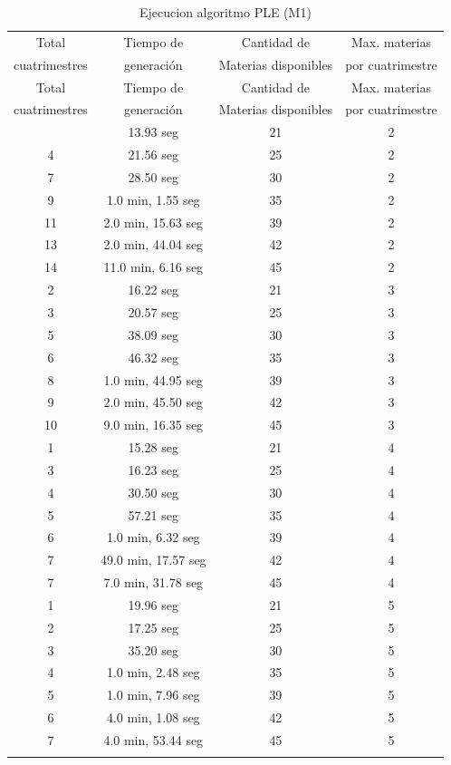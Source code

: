 \documentclass[a4paper]{article}
\begin{document}
\begin{longtable}{| c | c | c | c |}
\hline
Total   & Tiempo de & Cantidad de & Max. materias  \\
cuatrimestres &  generación &  Materias disponibles & por cuatrimestre \\
\hline \hline
\endfirsthead
\hline
Total   & Tiempo de & Cantidad de & Max. materias  \\
cuatrimestres &  generación &  Materias disponibles & por cuatrimestre \\
\hline \hline
\endhead
\endfoot
\endlastfoot
2 & 13.93 seg & 21 & 2\\
\hline
4 & 21.56 seg & 25 & 2\\
\hline
7 & 28.50 seg & 30 & 2\\
\hline
9 & 1.0 min, 1.55 seg & 35 & 2\\
\hline
11 & 2.0 min, 15.63 seg & 39 & 2\\
\hline
13 & 2.0 min, 44.04 seg & 42 & 2\\
\hline
14 & 11.0 min, 6.16 seg & 45 & 2\\
\hline
2 & 16.22 seg & 21 & 3\\
\hline
3 & 20.57 seg & 25 & 3\\
\hline
5 & 38.09 seg & 30 & 3\\
\hline
6 & 46.32 seg & 35 & 3\\
\hline
8 & 1.0 min, 44.95 seg & 39 & 3\\
\hline
9 & 2.0 min, 45.50 seg & 42 & 3\\
\hline
10 & 9.0 min, 16.35 seg & 45 & 3\\
\hline
1 & 15.28 seg & 21 & 4\\
\hline
3 & 16.23 seg & 25 & 4\\
\hline
4 & 30.50 seg & 30 & 4\\
\hline
5 & 57.21 seg & 35 & 4\\
\hline
6 & 1.0 min, 6.32 seg & 39 & 4\\
\hline
7 & 49.0 min, 17.57 seg & 42 & 4\\
\hline
7 & 7.0 min, 31.78 seg & 45 & 4\\
\hline
1 & 19.96 seg & 21 & 5\\
\hline
2 & 17.25 seg & 25 & 5\\
\hline
3 & 35.20 seg & 30 & 5\\
\hline
4 & 1.0 min, 2.48 seg & 35 & 5\\
\hline
5 & 1.0 min, 7.96 seg & 39 & 5\\
\hline
6 & 4.0 min, 1.08 seg & 42 & 5\\
\hline
7 & 4.0 min, 53.44 seg & 45 & 5\\
\hline
\caption{Ejecucion algoritmo PLE (M1)}
\end{longtable}
\end{document}
